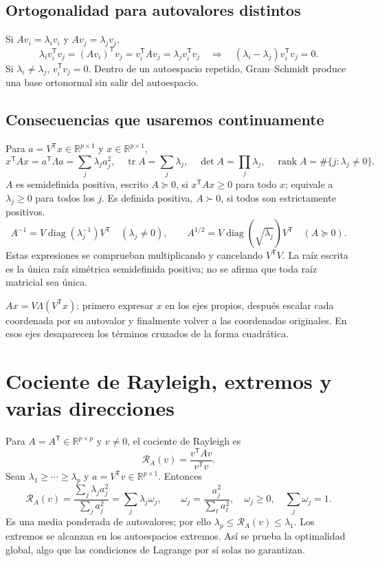 \documentclass[11pt,a4paper]{article}
\newcommand{\R}{\mathbb R}
\newcommand{\T}{^{\mathsf T}}
\DeclareMathOperator{\tr}{tr}
\DeclareMathOperator{\rank}{rank}
\DeclareMathOperator{\diag}{diag}
\theoremstyle{definition}
\begin{document}
\subsection{Ortogonalidad para autovalores distintos}
Si $Av_i=\lambda_iv_i$ y $Av_j=\lambda_jv_j$,
\[
\lambda_i v_i\T v_j=(Av_i)\T v_j=v_i\T Av_j
=\lambda_jv_i\T v_j
\quad\Rightarrow\quad(\lambda_i-\lambda_j)v_i\T v_j=0.
\]
Si $\lambda_i\ne\lambda_j$, $v_i\T v_j=0$. Dentro de un autoespacio repetido, Gram--Schmidt produce una base ortonormal sin salir del autoespacio.
\subsection{Consecuencias que usaremos continuamente}
Para $a=V\T x\in\R^{p\times1}$ y $x\in\R^{p\times1}$,
\[
x\T Ax=a\T\Lambda a=\sum_j\lambda_ja_j^2,\quad
\tr A=\sum_j\lambda_j,\quad \det A=\prod_j\lambda_j,\quad
\rank A=\#\{j:\lambda_j\ne0\}.
\]
$A$ es semidefinida positiva, escrito $A\succeq0$, si $x\T Ax\ge0$ para todo $x$; equivale a $\lambda_j\ge0$ para todos los $j$. Es definida positiva, $A\succ0$, si todos son estrictamente positivos.
\[
A^{-1}=V\diag(\lambda_j^{-1})V\T\quad(\lambda_j\ne0),\qquad
A^{1/2}=V\diag(\sqrt{\lambda_j})V\T\quad(A\succeq0).
\]
Estas expresiones se comprueban multiplicando y cancelando $V\T V$. La raíz escrita es la única raíz simétrica semidefinida positiva; no se afirma que toda raíz matricial sea única.
\begin{idea}
$A x=V\Lambda(V\T x)$: primero expresar $x$ en los ejes propios, después escalar cada coordenada por su autovalor y finalmente volver a las coordenadas originales. En esos ejes desaparecen los términos cruzados de la forma cuadrática.
\end{idea}

\section{Cociente de Rayleigh, extremos y varias direcciones}
Para $A=A\T\in\R^{p\times p}$ y $v\ne0$, el cociente de Rayleigh es
\[
\mathcal R_A(v)=\frac{v\T Av}{v\T v}.
\]
Sean $\lambda_1\ge\cdots\ge\lambda_p$ y $a=V\T v\in\R^{p\times1}$. Entonces
\[
\mathcal R_A(v)=\frac{\sum_j\lambda_ja_j^2}{\sum_j a_j^2}
=\sum_j\lambda_j\omega_j,\qquad \omega_j=\frac{a_j^2}{\sum_\ell a_\ell^2},\quad
\omega_j\ge0,\quad\sum_j\omega_j=1.
\]
Es una media ponderada de autovalores; por ello $\lambda_p\le\mathcal R_A(v)\le\lambda_1$. Los extremos se alcanzan en los autoespacios extremos. Así se prueba la optimalidad global, algo que las condiciones de Lagrange por sí solas no garantizan.
\end{document}
